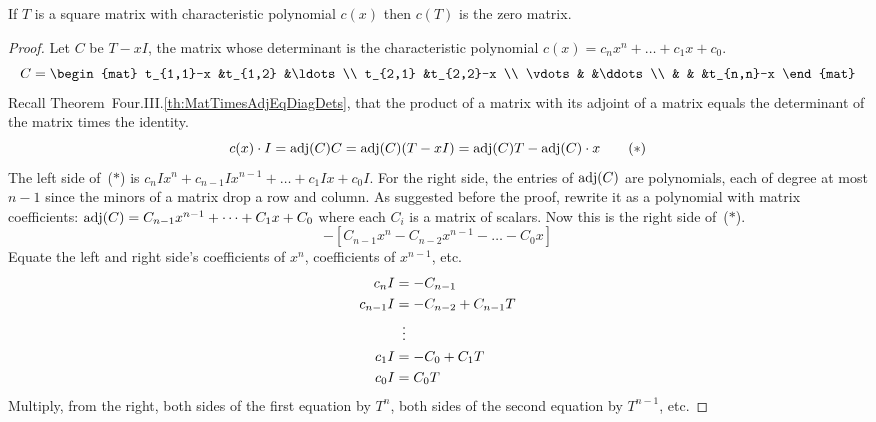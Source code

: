 \begin{lemma}   \label{le:MatSatItsCharPoly}
If \( T \) is a square matrix with characteristic polynomial \( c(x) \)
then \( c(T) \) is the zero matrix.
\end{lemma}

\begin{proof}
Let \( C \) be \( T-xI \),
the matrix whose determinant is the characteristic polynomial
\( c(x)=c_nx^n+\dots+c_1x+c_0 \).
\begin{equation*}
  C=\begin{mat}
    t_{1,1}-x        &t_{1,2}   &\ldots        \\
    t_{2,1}          &t_{2,2}-x               \\
    \vdots           &          &\ddots       \\
                     &          &       &t_{n,n}-x
  \end{mat}
\end{equation*}
Recall Theorem~Four.III.\ref{th:MatTimesAdjEqDiagDets},
that the product of a matrix with its adjoint of a matrix equals
the determinant of the matrix times the identity.
\begin{equation*}
  c(x)\cdot I
  =\operatorname{adj} (C)C
  =\operatorname{adj} (C)(T-xI)
  =\operatorname{adj} (C)T- \operatorname{adj}(C)\cdot x
\tag*{($*$)}
\end{equation*}
The left side of~($*$) is 
$c_nIx^n+c_{n-1}Ix^{n-1}+\dots+c_1Ix+c_0I$.
For the right side,
the entries of \( \operatorname{adj} (C) \) are polynomials, each of degree
at most \( n-1 \) since the minors of a matrix drop a row and column.
As suggested before the proof, rewrite it as a polynomial with
matrix coefficients:
\( \operatorname{adj} (C)=C_{n-1}x^{n-1}+\dots+C_1x+C_0 \)
where each \( C_i \) is a matrix of scalars.
Now this is the right side of~($*$).
\begin{equation*}
  [(C_{n-1}T)x^{n-1}+\dots+(C_1T)x+C_0T]  
   -[C_{n-1}x^n-C_{n-2}x^{n-1}-\dots-C_0x]
\end{equation*}
Equate the left and right side's
coefficients of \( x^n \), coefficients of $x^{n-1}$, etc.
\begin{align*}
  c_nI
  &=-C_{n-1}    \\
  c_{n-1}I
  &=-C_{n-2}+C_{n-1}T    \\
  &\vdotswithin{=}             \\
  c_{1}I
  &=-C_{0}+C_{1}T    \\
  c_{0}I
  &=C_{0}T
\end{align*}
Multiply, from the right, both sides of the first equation by \( T^n \), 
both sides of the second equation by \( T^{n-1} \), etc.

\end{proof}
